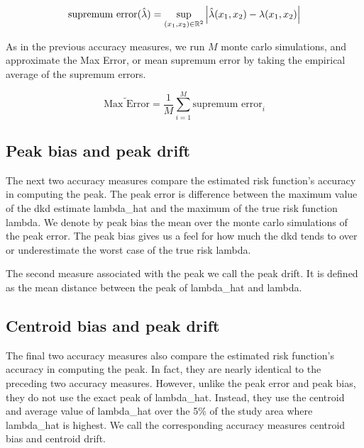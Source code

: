 \begin{equation}
    \mbox{supremum error}(\hat{\lambda}) = \sup_{(x_1, x_2) \in \mathbb{R}^2}
        {\left|
            \hat{\lambda}(x_1, x_2) - \lambda(x_1, x_2)
        \right|}
\end{equation}

As in the previous accuracy measures, we run \(M\) monte carlo simulations, and approximate the Max Error, or mean supremum error by taking the empirical average of the supremum errors.

\begin{equation}
    \widetilde{\mbox{Max Error}} = \frac{1}{M} \sum_{i=1}^{M} \mbox{supremum error}_i
\end{equation}

\subsection{Peak bias and peak drift}
\label{subsec:method:peak_bias}

The next two accuracy measures compare the estimated risk function's accuracy in computing the peak.
The \gls{peak error} is difference between the maximum value of the \gls{dkd} estimate \gls{lambda_hat} and the maximum of the true risk function \gls{lambda}.
We denote by \gls{peak bias} the mean over the monte carlo simulations of the \gls{peak error}.
The \gls{peak bias} gives us a feel for how much the \gls{dkd} tends to over or underestimate the worst case of the true risk \gls{lambda}.

The second measure associated with the peak we call the \gls{peak drift}.
It is defined as the mean distance between the peak of \gls{lambda_hat} and \gls{lambda}.

\subsection{Centroid bias and peak drift}
\label{subsec:method:centroid_bias}

The final two accuracy measures also compare the estimated risk function's accuracy in computing the peak.
In fact, they are nearly identical to the preceding two accuracy measures.
However, unlike the \gls{peak error} and \gls{peak bias}, they do not use the exact peak of \gls{lambda_hat}.
Instead, they use the centroid and average value of \gls{lambda_hat} over the 5\% of the study area where \gls{lambda_hat} is highest.
We call the corresponding accuracy measures \gls{centroid bias} and \gls{centroid drift}.

